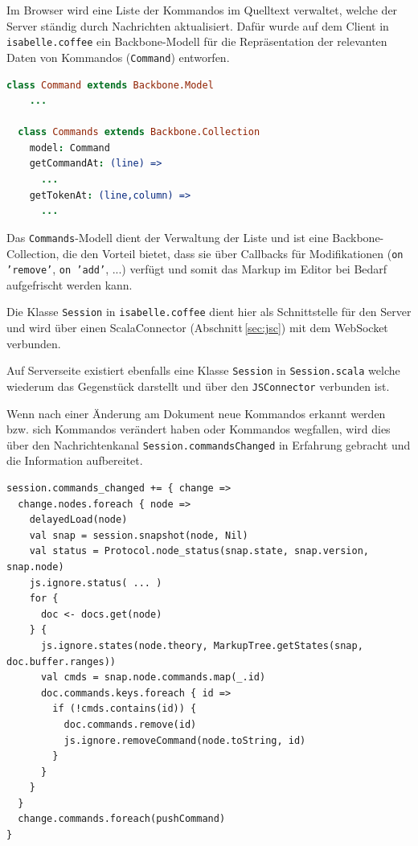 Im Browser wird eine Liste der Kommandos im Quelltext verwaltet, welche der Server ständig durch
Nachrichten aktualisiert. Dafür wurde auf dem Client in \texttt{isabelle.coffee} ein Backbone-Modell
für die Repräsentation der relevanten Daten von Kommandos (\texttt{Command}) entworfen.

\begin{lstlisting}[language=coffee]
  class Command extends Backbone.Model
    ...

  class Commands extends Backbone.Collection
    model: Command    
    getCommandAt: (line) => 
      ...
    getTokenAt: (line,column) =>
      ...
\end{lstlisting}

Das \texttt{Commands}-Modell dient der Verwaltung der Liste und ist eine Backbone-Collection, die
den Vorteil bietet, dass sie über Callbacks für Modifikationen (\texttt{on 'remove'}, \texttt{on
'add'}, ...) verfügt und somit das Markup im Editor bei Bedarf aufgefrischt werden kann.

Die Klasse \texttt{Session} in \texttt{isabelle.coffee} dient hier als Schnittstelle für den Server
und wird über einen ScalaConnector (Abschnitt\,\ref{sec:jsc}) mit dem WebSocket verbunden.

Auf Serverseite existiert ebenfalls eine Klasse \texttt{Session} in \texttt{Session.scala} welche
wiederum das Gegenstück darstellt und über den \texttt{JSConnector} verbunden ist.

Wenn nach einer Änderung am Dokument neue Kommandos erkannt werden bzw. sich Kommandos verändert
haben oder Kommandos wegfallen, wird dies über den Nachrichtenkanal \texttt{Session.commandsChanged}
in Erfahrung gebracht und die Information aufbereitet.

\begin{lstlisting}
session.commands_changed += { change =>
  change.nodes.foreach { node =>
    delayedLoad(node)
    val snap = session.snapshot(node, Nil)
    val status = Protocol.node_status(snap.state, snap.version, snap.node)      
    js.ignore.status( ... )      
    for {
      doc <- docs.get(node)        
    } {        
      js.ignore.states(node.theory, MarkupTree.getStates(snap, doc.buffer.ranges))
      val cmds = snap.node.commands.map(_.id)
      doc.commands.keys.foreach { id =>
        if (!cmds.contains(id)) {
          doc.commands.remove(id)
          js.ignore.removeCommand(node.toString, id)
        }
      }
    }       
  }
  change.commands.foreach(pushCommand)    
}
\end{lstlisting}

